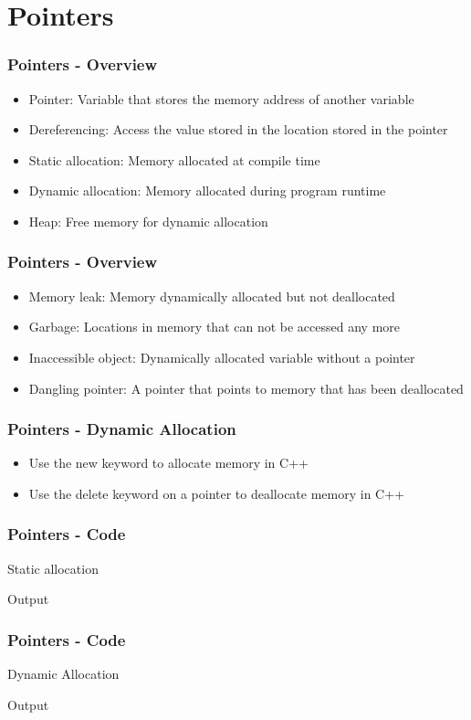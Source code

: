 \section{Pointers}
\begin{frame}\frametitle{Pointers - Overview}
\begin{itemize}
\item Pointer: Variable that stores the memory address of another variable
\item Dereferencing: Access the value stored in the location stored in the pointer
\item Static allocation: Memory allocated at compile time
\item Dynamic allocation: Memory allocated during program runtime
\item Heap: Free memory for dynamic allocation
\end{itemize}
\end{frame}

\begin{frame}\frametitle{Pointers - Overview}
\begin{itemize}
\item Memory leak: Memory dynamically allocated but not deallocated
\item Garbage: Locations in memory that can not be accessed any more
\item Inaccessible object: Dynamically allocated variable without a pointer
\item Dangling pointer: A pointer that points to memory that has been deallocated
\end{itemize}
\end{frame}

\begin{frame}\frametitle{Pointers - Dynamic Allocation}
\begin{itemize}
\item Use the new keyword to allocate memory in C++
\item Use the delete keyword on a pointer to deallocate memory in C++
\end{itemize}
\end{frame}

\begin{frame}\frametitle{Pointers - Code}
Static allocation


Output

\end{frame}

\begin{frame}\frametitle{Pointers - Code}
Dynamic Allocation


Output

\end{frame}
